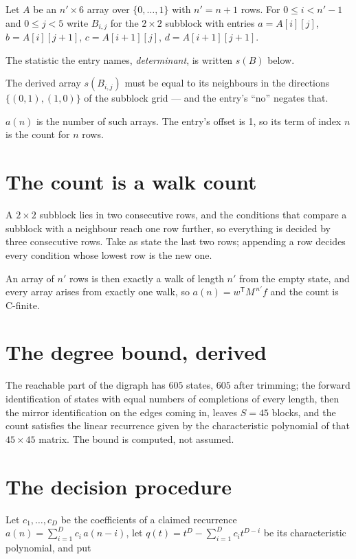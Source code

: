 \documentclass[11pt]{article}
\theoremstyle{definition}
\begin{document}
Let $A$ be an $n' \times 6$ array over $\{0,\dots,1\}$ with $n' = n + 1$ rows. For $0 \le i < n'-1$ and $0 \le j < 5$ write $B_{i,j}$ for the $2\times2$ subblock with entries $a = A[i][j]$, $b = A[i][j{+}1]$, $c = A[i{+}1][j]$, $d = A[i{+}1][j{+}1]$.

The statistic the entry names, {\itshape determinant}, is written $s(B)$ below.

The derived array $s(B_{i,j})$ must be equal to its neighbours in the directions $\{(0,1), (1,0)\}$ of the subblock grid --- and the entry's ``no'' negates that.

$a(n)$ is the number of such arrays. The entry's offset is 1, so its term of index $n$ is the count for $n$ rows.

\section{The count is a walk count}

A $2\times2$ subblock lies in two consecutive rows, and the conditions that compare a subblock with a neighbour reach one row further, so everything is decided by three consecutive rows. Take as state the last two rows; appending a row decides every condition whose lowest row is the new one.

An array of $n'$ rows is then exactly a walk of length $n'$ from the empty state, and every array arises from exactly one walk, so $a(n) = w^{\mathsf T}M^{\,n'}f$ and the count is C-finite.

\section{The degree bound, derived}

The reachable part of the digraph has $605$ states, $605$ after trimming; the forward identification of states with equal numbers of completions of every length, then the mirror identification on the edges coming in, leaves $S = 45$ blocks, and the count satisfies the linear recurrence given by the characteristic polynomial of that $45\times45$ matrix. The bound is computed, not assumed.

\section{The decision procedure}

Let $c_1,\dots,c_D$ be the coefficients of a claimed recurrence $a(n) = \sum_{i=1}^{D} c_i\,a(n-i)$, let $q(t) = t^{D} - \sum_{i=1}^{D} c_i t^{D-i}$ be its characteristic polynomial, and put
\end{document}
